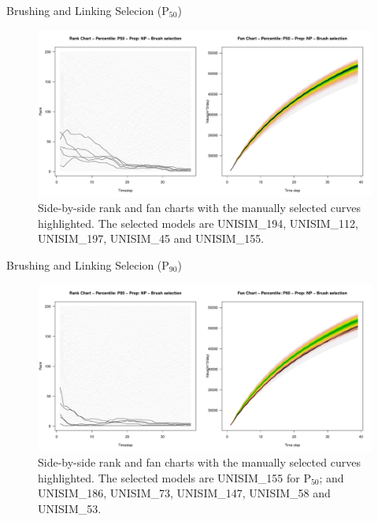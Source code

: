 \documentclass{beamer}
\begin{document}
\begin{frame}{Brushing and Linking Selecion (P$_{50}$)}
  \begin{figure}[H]
    \centering
    \includegraphics[width=0.9\columnwidth]{rank-fan-brush-p50.pdf}
    \caption{Side-by-side rank and fan charts with the manually selected curves highlighted. The selected models are UNISIM\_194, UNISIM\_112, UNISIM\_197, UNISIM\_45 and UNISIM\_155.}
    \label{fig:rank-fan-brush-p50}
  \end{figure}
\end{frame}

\begin{frame}{Brushing and Linking Selecion (P$_{90}$)}
  \begin{figure}[H]
    \centering
    \includegraphics[width=0.9\columnwidth]{rank-fan-brush-p90.pdf}
    \caption{Side-by-side rank and fan charts with the manually selected curves highlighted. The selected models are UNISIM\_155 for P$_{50}$; and UNISIM\_186, UNISIM\_73, UNISIM\_147, UNISIM\_58 and UNISIM\_53.}
    \label{fig:rank-fan-brush-p90}
  \end{figure}
\end{frame}
\end{document}
